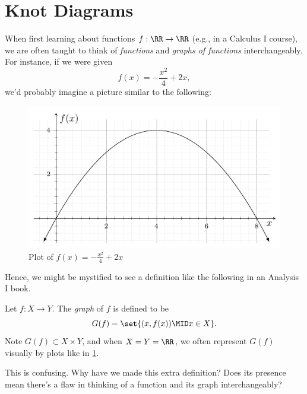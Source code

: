 \section{Knot Diagrams}\label{sec:KnotDiags}
When first learning about functions $f : \RR \to \RR$ (e.g., in a
Calculus I course), we are often taught to think of \emph{functions}
and \emph{graphs of functions} interchangeably. For instance, if we
were given
\[
  f(x) = -\frac{x^2}{4} + 2x,
\]
we'd probably imagine a picture similar to the following:
\begin{figure}[H]
  \centering
  \includegraphics{figures/background/parabola.pdf}
  \caption{Plot of $f(x) = -\frac{x^2}{4} + 2x$}
  \label{fig:plotoffunc}
\end{figure}
\noindent Hence, we might be mystified to see a definition like the
following in an Analysis I book.
\begin{definition}
  Let $f : X \to Y$. The \emph{graph} of $f$ is defined to be
  \[
    G(f) = \set{(x, f(x)) \MID x \in X}.
  \]
  Note $G(f) \subset X \times Y$, and when $X = Y = \RR$, we often
  represent $G(f)$ visually by plots like in \cref{fig:plotoffunc}.
\end{definition}
This is confusing. Why have we made this extra definition? Does its
presence mean there's a flaw in thinking of a function and its graph
interchangeably?



